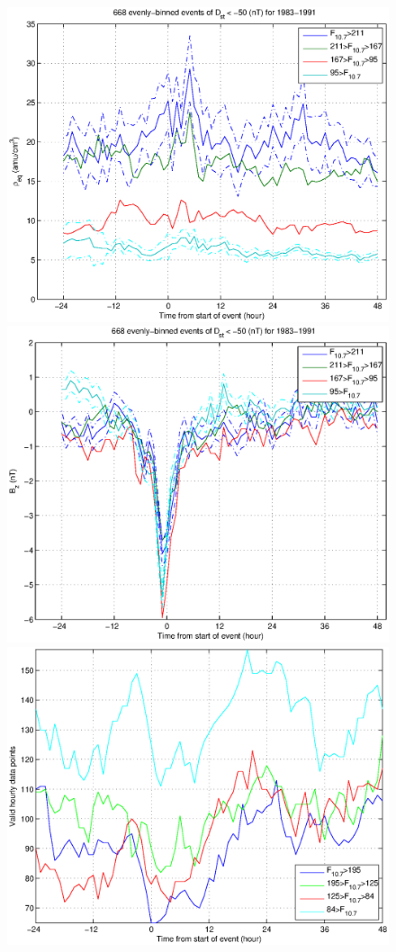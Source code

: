 \documentclass[10pt,twocolumn]{article}
\begin{document}
\begin{figure}[tp!]
\centering
\includegraphics[scale=0.40]{paperfigures/HighLowF107rhoeq.eps}
\includegraphics[scale=0.40]{paperfigures/HighLowF107Bz.eps}
\includegraphics[scale=0.40]{paperfigures/HighLowF107valid.eps}

\end{figure}
\end{document}
